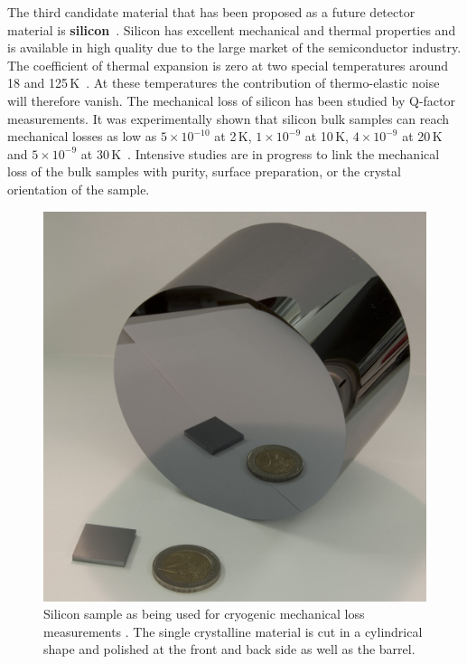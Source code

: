 The third candidate material that has been proposed as a future detector material is {\bf silicon}~\cite{Punturo2010, Rowan2003}. Silicon has excellent mechanical and thermal properties and is available in high quality due to the large market of the semiconductor industry. The coefficient of thermal expansion is zero at two special temperatures around 18 and 125\,K~\cite{MPDB}. At these temperatures the contribution of thermo-elastic noise will therefore vanish. The mechanical loss of silicon has been studied by Q-factor measurements. It was experimentally shown that silicon bulk samples can reach mechanical losses as low as $5\times10^{-10}$ at 2\,K, $1\times10^{-9}$ at 10\,K, $4\times10^{-9}$ at 20\,K and $5\times10^{-9}$ at 30\,K~\cite{McGuigan1978}. Intensive studies are in progress to link the mechanical loss of the bulk samples with purity, surface preparation, or the crystal orientation of the sample. 

\begin{figure}[h]
\begin{center}
\includegraphics[width=0.49\linewidth]{Sec_Optics/Si_bulk.jpg}
\caption{Silicon sample as being used for cryogenic mechanical loss measurements \cite{Nawrodt2008}. The single crystalline material is cut in a cylindrical shape and polished at the front and back side as well as the barrel.}
\label{fig:si_pic}
\end{center}
\end{figure}

